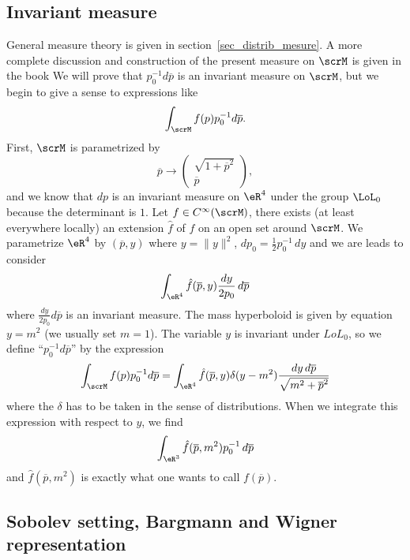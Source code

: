 \subsection{Invariant measure}

General measure theory is given in section~\ref{sec_distrib_mesure}. A more complete discussion and construction of the present measure on $\scrM$ is given in the book \cite{Reed_Simon} We will prove that $p_0^{-1}d\overline{p}$ is an invariant measure on $\scrM$, but we begin to give a sense to expressions like
\[
	\int_{\scrM} f(p)p_0^{-1}d\overline{p}.
\]
First, $\scrM$ is parametrized by
\[
	\overline{p}\to
	\begin{pmatrix}
		\sqrt{1+\overline{p}^2} \\\overline{p}
	\end{pmatrix},
\]
and we know that $dp$ is an invariant measure on $\eR^4$ under the group $\LoL_0$ because the determinant is $1$. Let $f\in C^{\infty}(\scrM)$, there exists (at least everywhere locally) an extension $\hat f$ of $f$ on an open set around $\scrM$. We parametrize $\eR^4$ by $(\overline{p},y)$ where $y=\| y \|^2$, $dp_0=\frac{ 1 }{2}p_0^{-1}\,dy$ and we are leads to consider
\[
	\int_{\eR^4}\hat f(\overline{p},y)\frac{ dy }{ 2p_0 }\,d\overline{p}
\]
where $\frac{ dy }{ 2p_0 }d\overline{p}$ is an invariant measure. The mass hyperboloid is given by equation $y=m^2$ (we usually set $m=1$). The variable $y$ is invariant under $LoL_0$, so we define ``$p_0^{-1}d\overline{p}$'' by the expression
\begin{equation}
	\int_{\scrM}f(p)p_0^{-1}d\overline{p}= \int_{\eR^4}\hat f(\overline{p},y)\delta(y-m^2)\frac{ dy\,d\overline{p} }{ \sqrt{m^2+\overline{p}^2} }
\end{equation}
where the $\delta$ has to be taken in the sense of distributions. When we integrate this expression with respect to $y$, we find
\[
	\int_{\eR^3}\hat f(\overline{p},m^2)p_0^{-1}\,d\overline{p}
\]
and $\hat f(\overline{p},m^2)$ is exactly what one wants to call $f(\overline{p})$.

\subsection{Sobolev setting, Bargmann and Wigner representation}

